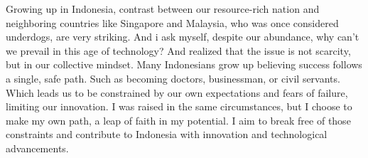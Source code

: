 Growing up in Indonesia, contrast between our resource-rich nation and neighboring countries like Singapore and Malaysia, 
who was once considered underdogs, are very striking. And i ask myself, despite our abundance, why can't we prevail in this
age of technology? And realized that the issue is not scarcity, but in our collective mindset. Many Indonesians grow up believing
success follows a single, safe path. Such as becoming doctors, businessman, or civil servants. Which leads us to be constrained
by our own expectations and fears of failure, limiting our innovation. I was raised in the same circumstances, but I choose to
make my own path, a leap of faith in my potential. I aim to break free of those constraints and contribute to Indonesia with innovation
and technological advancements. \GetUniversityName
